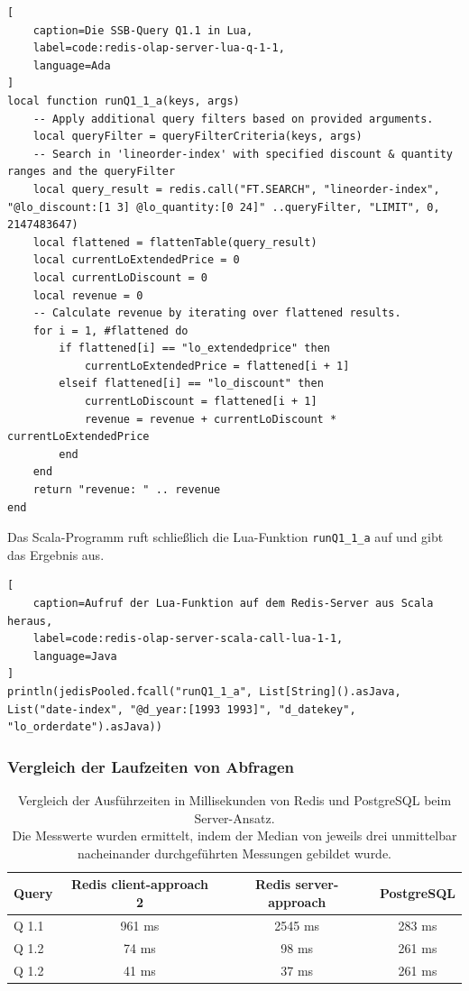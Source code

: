 \begin{lstlisting}[
    caption=Die SSB-Query Q1.1 in Lua,
    label=code:redis-olap-server-lua-q-1-1,
    language=Ada
]
local function runQ1_1_a(keys, args)
    -- Apply additional query filters based on provided arguments.
    local queryFilter = queryFilterCriteria(keys, args)
    -- Search in 'lineorder-index' with specified discount & quantity ranges and the queryFilter
    local query_result = redis.call("FT.SEARCH", "lineorder-index", "@lo_discount:[1 3] @lo_quantity:[0 24]" ..queryFilter, "LIMIT", 0, 2147483647)
    local flattened = flattenTable(query_result)
    local currentLoExtendedPrice = 0
    local currentLoDiscount = 0
    local revenue = 0
    -- Calculate revenue by iterating over flattened results.
    for i = 1, #flattened do
        if flattened[i] == "lo_extendedprice" then
            currentLoExtendedPrice = flattened[i + 1]
        elseif flattened[i] == "lo_discount" then
            currentLoDiscount = flattened[i + 1]
            revenue = revenue + currentLoDiscount * currentLoExtendedPrice
        end
    end
    return "revenue: " .. revenue
end
\end{lstlisting}

Das Scala-Programm ruft schließlich die Lua-Funktion \lstinline|runQ1_1_a| auf und gibt das Ergebnis aus.

\begin{lstlisting}[
    caption=Aufruf der Lua-Funktion auf dem Redis-Server aus Scala heraus,
    label=code:redis-olap-server-scala-call-lua-1-1,
    language=Java
]
println(jedisPooled.fcall("runQ1_1_a", List[String]().asJava, List("date-index", "@d_year:[1993 1993]", "d_datekey", "lo_orderdate").asJava))
\end{lstlisting}


\subsubsection{Vergleich der Laufzeiten von Abfragen}

\begin{table}[h]
\centering
\begin{tabular}{lccc}
\hline
Query & Redis client-approach 2 & Redis server-approach & PostgreSQL \\ \hline
Q 1.1 & 961 ms & 2545 ms  & 283 ms       \\
Q 1.2 & 74 ms & 98 ms    & 261 ms       \\ 
Q 1.2 & 41 ms & 37 ms    & 261 ms       \\ \hline
\end{tabular}
\caption{Vergleich der Ausführzeiten in Millisekunden von Redis und PostgreSQL beim Server-Ansatz.\\
 Die Messwerte wurden ermittelt, indem der Median von jeweils drei unmittelbar nacheinander durchgeführten Messungen gebildet wurde.}
\label{tab:results-server}
\end{table}

